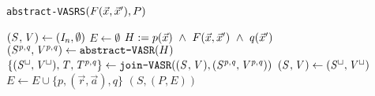
	\begin{algorithm}
		\caption{\texttt{abstract-VASRS}$(F(\vec{x}, \vec{x}'), P)$}\label{euclid}
		\begin{algorithmic}[1]
			\State $\mathit{(S^{}, V^{})} \gets (\mathit{I_n}, \emptyset)$
			\State $E \gets \emptyset$
					\State $H := p(\vec{x})\ \land\  F(\vec{x}, \vec{x}')\ \land \ q(\vec{x}')$
					\State $\mathit{(S^{p, q}, V^{p, q})} \gets \texttt{abstract-VASR}(H)$
				\EndFor
			\EndFor
				\State $\{ \mathit{(S^{\sqcup}, V^{\sqcup})}, \mathit{T, T^{p,q}} \} \gets \texttt{join-VASR}(\mathit{(S^{}, V^{})}, \mathit{(S^{p, q}, V^{p, q})})$
				\State $\mathit{(S^{}, V^{})} \gets \mathit{(S^{\sqcup}, V^{\sqcup})}$
					\State $E \gets E \cup \{p, (\vec{r}, \vec{a}), q\}$
				\EndFor
			\EndFor
			\Return $(S,(P, E))$
		\end{algorithmic}
	\end{algorithm}